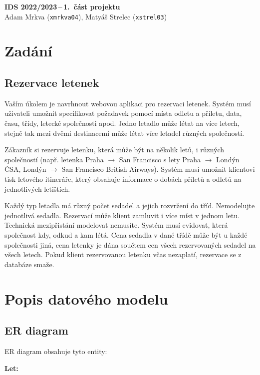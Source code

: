\documentclass[11pt,a4paper,landscape]{article}
\begin{document}
{
\noindent
\Large{\textbf{IDS 2022/2023\,--\,1.~část projektu}} \\ \normalsize
Adam Mrkva (\verb|xmrkva04|), Matyáš Strelec (\verb|xstrel03|)}

\begin{multicols*}{2}

\section{Zadání}

\subsection*{Rezervace letenek}

Vaším úkolem je navrhnout webovou aplikaci pro rezervaci letenek. Systém musí uživateli umožnit specifikovat požadavek pomocí místa odletu a příletu, data, času, třídy, letecké společnosti apod. Jedno letadlo může létat na více letech, stejně tak mezi dvěmi destinacemi může létat více letadel různých společností.

Zákazník si rezervuje letenku, která může být na několik letů, i různých společností (např. letenka Praha $\rightarrow$ San Francisco s lety Praha $\rightarrow$ Londýn ČSA, Londýn $\rightarrow$ San Francisco British Airways). Systém musí umožnit klientovi tisk letového itineráře, který obsahuje informace o dobách příletů a odletů na jednotlivých letištích.

Každý typ letadla má různý počet sedadel a jejich rozvržení do tříd. Nemodelujte jednotlivá sedadla. Rezervací může klient zamluvit i více míst v jednom letu. Technická mezipřistání modelovat nemusíte. Systém musí evidovat, která společnost kdy, odkud a kam létá. Cena sedadla v dané třídě může být u každé společnosti jiná, cena letenky je dána součtem cen všech rezervovaných sedadel na všech letech. Pokud klient rezervovanou letenku včas nezaplatí, rezervace se z databáze smaže. 

\section{Popis datového modelu}

\subsection{ER diagram}
ER diagram obsahuje tyto entity:

\textbf{Let:}


\end{multicols*}
\end{document}
